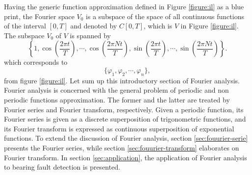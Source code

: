 \documentclass[../Main/thesis.tex]{subfiles}
\begin{document}
\justify
Having the generic function approximation defined in Figure \ref{figure:il} as a blue print, the Fourier space $V_{0}$ is a subspace of the space of all continuous functions of the interval $[0, T]$ and denoted by $C[0,T] $, which is $V$ in Figure \ref{figure:il}. The subspace $V_{0}$ of $V$ is spanned by 
\begin{equation}
\left\{1, \cos\left( \frac{2\pi t}{T} \right), \cdots,\cos\left( \frac{2\pi Nt}{T} \right), \sin\left( \frac{2\pi t}{T} \right), \cdots,\sin\left( \frac{2\pi Nt}{T} \right)   \right\}. \nonumber
\end{equation}
which corresponds to
\begin{equation}
\{\varphi_{1}, \varphi_{2}, \cdots, \varphi_{n}\}, \nonumber
\end{equation}
from figure \ref{figure:il}. 
\justify
Let sum up this introductory section of Fourier analysis. Fourier analysis is concerned with the general problem of periodic and non periodic functions approximation. The former and the latter are treated by Fourier series and Fourier transform, respectively. Given a periodic function, its Fourier series is given as a discrete superposition of trigonometric functions, and its Fourier transform is expressed as continuous superposition of exponential functions.
To extend the discussion of Fourier analysis, section \ref{sec:fouurier-serie} presents the Fourier series, while section \ref{sec:fouurier-transform} elaborates on Fourier transform. In section \ref{sec:application}, the application of Fourier analysis to bearing fault detection is presented.

\justify
\end{document}
